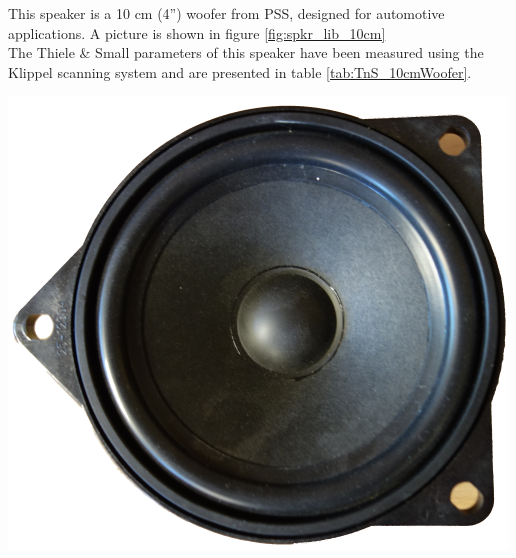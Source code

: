 \documentclass{report}
\begin{document}
\begin{appendices}
\begin{minipage}{0.6\textwidth}
This speaker is a 10 cm (4'') woofer from PSS, designed for automotive applications. A picture is shown in figure \ref{fig:spkr_lib_10cm}\\ 
The Thiele \& Small  parameters of this speaker have been measured using the Klippel scanning system and are presented in table \ref{tab:TnS_10cmWoofer}. 
\end{minipage}
\begin{minipage}{0.4\textwidth}
\begin{center}
	\includegraphics[scale=1]{Appendix/Round_Spkr}
    \captionsetup{hypcap=false}
    \label{fig:spkr_lib_10cm}
\end{center}
\end{minipage}





\end{appendices}
\end{document}
